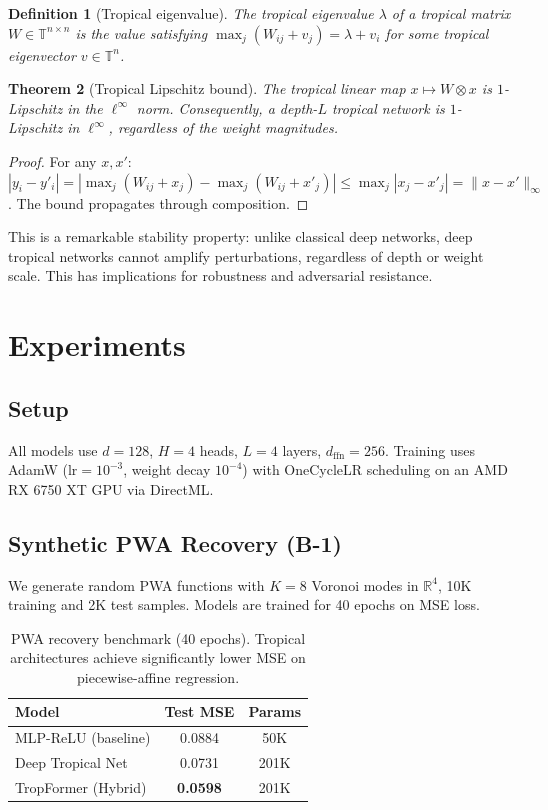 \documentclass[11pt,twocolumn]{article}
\newtheorem{theorem}{Theorem}[section]
\newtheorem{definition}[theorem]{Definition}
\newcommand{\R}{\mathbb{R}}
\newcommand{\T}{\mathbb{T}}
\newcommand{\tropmult}{\otimes}
\begin{document}
\begin{definition}[Tropical eigenvalue]
The \emph{tropical eigenvalue} $\lambda$ of a tropical matrix $W \in \T^{n
\times n}$ is the value satisfying
$\max_j(W_{ij} + v_j) = \lambda + v_i$
for some tropical eigenvector $v \in \T^n$.
\end{definition}

\begin{theorem}[Tropical Lipschitz bound]\label{thm:lipschitz}
The tropical linear map $x \mapsto W \tropmult x$ is $1$-Lipschitz in the
$\ell^\infty$ norm. Consequently, a depth-$L$ tropical network is
$1$-Lipschitz in $\ell^\infty$, regardless of the weight magnitudes.
\end{theorem}

\begin{proof}
For any $x, x'$: $|y_i - y'_i| = |\max_j(W_{ij} + x_j) - \max_j(W_{ij}
+ x'_j)| \leq \max_j |x_j - x'_j| = \|x - x'\|_\infty$. The bound
propagates through composition.
\end{proof}

This is a remarkable stability property: unlike classical deep networks,
deep tropical networks cannot amplify perturbations, regardless of depth or
weight scale. This has implications for robustness and adversarial
resistance.

\section{Experiments}\label{sec:experiments}

\subsection{Setup}

All models use $d = 128$, $H = 4$ heads, $L = 4$ layers, $d_\text{ffn} = 256$.
Training uses AdamW ($\text{lr} = 10^{-3}$, weight decay $10^{-4}$) with
OneCycleLR scheduling on an AMD RX 6750 XT GPU via DirectML.

\subsection{Synthetic PWA Recovery (B-1)}

We generate random PWA functions with $K=8$ Voronoi modes in $\R^4$,
10K training and 2K test samples. Models are trained for 40 epochs on MSE
loss.

\begin{table}[t]
\centering
\caption{PWA recovery benchmark (40 epochs). Tropical architectures
  achieve significantly lower MSE on piecewise-affine regression.}
\label{tab:pwa}
\begin{tabular}{lcc}
\toprule
\textbf{Model} & \textbf{Test MSE} & \textbf{Params} \\
\midrule
MLP-ReLU (baseline)   & 0.0884 & 50K \\
Deep Tropical Net     & 0.0731 & 201K \\
TropFormer (Hybrid)   & \textbf{0.0598} & 201K \\
\bottomrule
\end{tabular}
\end{table}
\end{document}

